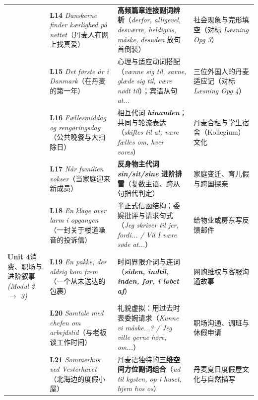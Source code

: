 \documentclass[10.5pt, a4paper]{ctexart}
\begin{document}
{\begin{longtable}{@{} >{\raggedright\arraybackslash}p{2.65cm} >{\raggedright\arraybackslash}p{4.6cm} >{\raggedright\arraybackslash}p{5.15cm} >{\raggedright\arraybackslash}p{3.2cm} @{}}
 & \textbf{L14} \textit{Danskerne finder kærlighed på nettet}\newline （丹麦人在网上找真爱） & \textbf{高频篇章连接副词辨析}（\textit{derfor, alligevel, desværre, heldigvis, måske, desuden} 放句首倒装） & 社会现象与完形填空（对标 \textit{Læsning Opg 3}） \\
 & \textbf{L15} \textit{Det første år i Danmark}\newline （在丹麦的第一年） & 心理与适应动词搭配（\textit{vænne sig til, savne, glæde sig til, være nødt til}）；宾语从句 \textit{at...} & 三位外国人的丹麦适应记（对标 \textit{Læsning Opg 4}） \\
 & \textbf{L16} \textit{Fællesmiddag og rengøringsdag}\newline （公共晚餐与大扫除日） & 相互代词 \textbf{\textit{hinanden}}；共同与轮流表达（\textit{skiftes til at, være fælles om, hver vores}） & 丹麦合租与学生宿舍（Kollegium）文化 \\
 & \textbf{L17} \textit{Når familien vokser}\newline （当家庭迎来新成员） & \textbf{反身物主代词 \textit{sin/sit/sine} 进阶排雷}（复数主语、跨从句指代判定） & 家庭变迁、育儿假与跨国探亲 \\
 & \textbf{L18} \textit{En klage over larm i opgangen}\newline （一封关于楼道噪音的投诉信） & 半正式信函结构；委婉批评与请求句式（\textit{Jeg skriver til jer, fordi... / Vil I være søde at...}） & 给物业或房东写反馈邮件 \\
\midrule
\textbf{Unit 4}\newline 消费、职场与\newline 进阶叙事\newline \textit{(Modul 2 $\rightarrow$ 3)} & \textbf{L19} \textit{En pakke, der aldrig kom frem}\newline （一个从未送达的包裹） & 时间界限介词与连词（\textbf{\textit{siden, indtil, inden, før, i løbet af}}） & 网购维权与客服沟通故事 \\
 & \textbf{L20} \textit{Samtale med chefen om arbejdstid}\newline （与老板谈工作时间） & 礼貌虚拟：用过去时表委婉请求（\textit{Kunne vi måske...? / Jeg ville gerne høre, om...}） & 职场沟通、调班与休假申请 \\
 & \textbf{L21} \textit{Sommerhus ved Vesterhavet}\newline （北海边的度假小屋） & 丹麦语独特的\textbf{三维空间方位副词组合}（\textit{ud til kysten, op i huset, hjem hos os}） & 丹麦夏日度假屋文化与自然描写 \\

\end{longtable}}
\end{document}
